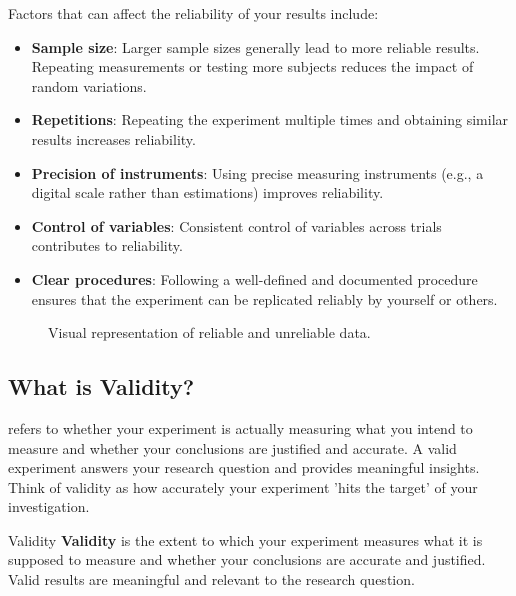 Factors that can affect the reliability of your results include:

\begin{itemize}
    \item \textbf{Sample size}:  Larger sample sizes generally lead to more reliable results.  Repeating measurements or testing more subjects reduces the impact of random variations.
    \item \textbf{Repetitions}: Repeating the experiment multiple times and obtaining similar results increases reliability.
    \item \textbf{Precision of instruments}: Using precise measuring instruments (e.g., a digital scale rather than estimations) improves reliability.
    \item \textbf{Control of variables}:  Consistent control of variables across trials contributes to reliability.
    \item \textbf{Clear procedures}:  Following a well-defined and documented procedure ensures that the experiment can be replicated reliably by yourself or others.
\end{itemize}

\begin{figure}
\centering
{}
\caption{Visual representation of reliable and unreliable data.}
\end{figure}

\subsection{What is Validity?}

 refers to whether your experiment is actually measuring what you intend to measure and whether your conclusions are justified and accurate.  A valid experiment answers your research question and provides meaningful insights.  Think of validity as how accurately your experiment 'hits the target' of your investigation.

\begin{keyconcept}{Validity}
\textbf{Validity} is the extent to which your experiment measures what it is supposed to measure and whether your conclusions are accurate and justified. Valid results are meaningful and relevant to the research question.
\end{keyconcept}

